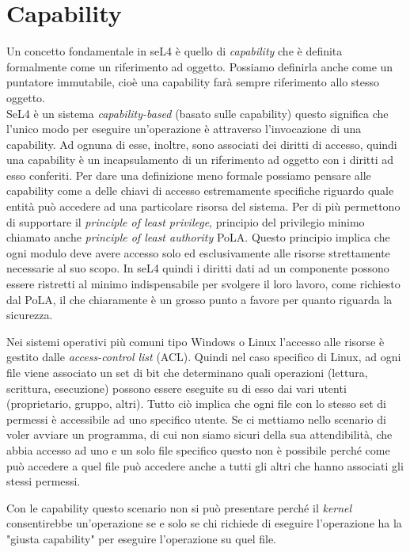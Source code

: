 \section{Capability}
Un concetto fondamentale in seL4 è quello di \textit{capability} che è definita formalmente come un riferimento ad oggetto. Possiamo definirla anche come un puntatore immutabile, cioè una capability farà sempre riferimento allo stesso oggetto.\\
SeL4 è un sistema \textit{capability-based} (basato sulle capability) questo significa che l'unico modo per eseguire un'operazione è attraverso l'invocazione di una capability. Ad ognuna di esse, inoltre, sono associati dei diritti di accesso, quindi una capability è un incapsulamento di un riferimento ad oggetto con i diritti ad esso conferiti.
Per dare una definizione meno formale possiamo pensare alle capability come a delle chiavi di accesso estremamente specifiche riguardo quale entità può accedere ad una particolare risorsa del sistema. Per di più permettono di supportare il \textit{principle of least privilege}, principio del privilegio minimo chiamato anche \textit{principle of least authority} PoLA. Questo principio implica che ogni modulo deve avere accesso solo ed esclusivamente alle risorse strettamente necessarie al suo scopo.
In seL4 quindi i diritti dati ad un componente possono essere ristretti al minimo indispensabile per svolgere il loro lavoro, come richiesto dal PoLA, il che chiaramente è un grosso punto a favore per quanto riguarda la sicurezza.

Nei sistemi operativi più comuni tipo Windows o Linux l'accesso alle risorse è gestito dalle \textit{access-control list} (ACL). Quindi nel caso specifico di Linux, ad ogni file viene associato un set di bit che determinano quali operazioni (lettura, scrittura, esecuzione) possono essere eseguite su di esso dai vari utenti (proprietario, gruppo, altri). Tutto ciò implica che ogni file con lo stesso set di permessi è accessibile ad uno specifico utente. Se ci mettiamo nello scenario di voler avviare un programma, di cui non siamo sicuri della sua attendibilità, che abbia accesso ad uno e un solo file specifico questo non è possibile perché come può accedere a quel file può accedere anche a tutti gli altri che hanno associati gli stessi permessi.

Con le capability questo scenario non si può presentare perché il \textit{kernel} consentirebbe un'operazione se e solo se chi richiede di eseguire l'operazione ha la "giusta capability" per eseguire l'operazione su quel file. 

